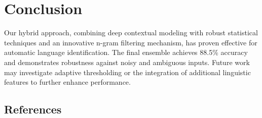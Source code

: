 \documentclass[11pt]{article}
\begin{document}
\section{Conclusion}
Our hybrid approach, combining deep contextual modeling with robust statistical techniques and an innovative n-gram filtering mechanism, has proven effective for automatic language identification. The final ensemble achieves 88.5\% accuracy and demonstrates robustness against noisy and ambiguous inputs. Future work may investigate adaptive thresholding or the integration of additional linguistic features to further enhance performance.

\subsection{References}

\nocite{joulin2017bag,sanh2019distilbert,bojanowski2017enriching,he2021deberta,banon2024fastspell,windisch2023glotlid,ustun2024aya}



\end{document}
